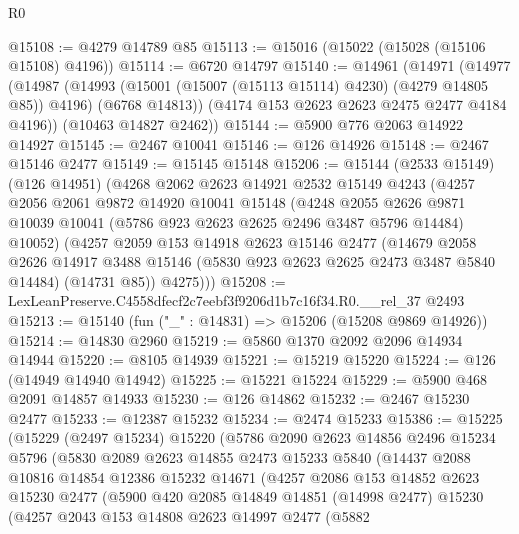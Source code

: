 \begin{lexlean}{R0}
\begin{coremodule}
@15108 := @4279 @14789 @85
@15113 := @15016 (@15022 (@15028 (@15106 @15108) @4196))
@15114 := @6720 @14797
@15140 := @14961
    (@14971
      (@14977
        (@14987
          (@14993 (@15001 (@15007 (@15113 @15114) @4230) (@4279 @14805 @85)) @4196)
          (@6768 @14813))
        (@4174 @153 @2623 @2623 @2475 @2477 @4184 @4196))
      (@10463 @14827 @2462))
@15144 := @5900 @776 @2063 @14922 @14927
@15145 := @2467 @10041
@15146 := @126 @14926
@15148 := @2467 @15146 @2477
@15149 := @15145 @15148
@15206 := @15144
    (@2533 @15149)
    (@126 @14951)
    (@4268
      @2062
      @2623
      @14921
      @2532
      @15149
      @4243
      (@4257
        @2056
        @2061
        @9872
        @14920
        @10041
        @15148
        (@4248
          @2055
          @2626
          @9871
          @10039
          @10041
          (@5786 @923 @2623 @2625 @2496 @3487 @5796 @14484)
          @10052)
        (@4257
          @2059
          @153
          @14918
          @2623
          @15146
          @2477
          (@14679
            @2058
            @2626
            @14917
            @3488
            @15146
            (@5830 @923 @2623 @2625 @2473 @3487 @5840 @14484)
            (@14731 @85))
          @4275)))
@15208 := LexLeanPreserve.C4558dfecf2c7eebf3f9206d1b7c16f34.R0.__rel_37 @2493
@15213 := @15140 (fun ("_" : @14831) => @15206 (@15208 @9869 @14926))
@15214 := @14830 @2960
@15219 := @5860 @1370 @2092 @2096 @14934 @14944
@15220 := @8105 @14939
@15221 := @15219 @15220
@15224 := @126 (@14949 @14940 @14942)
@15225 := @15221 @15224
@15229 := @5900 @468 @2091 @14857 @14933
@15230 := @126 @14862
@15232 := @2467 @15230 @2477
@15233 := @12387 @15232
@15234 := @2474 @15233
@15386 := @15225
    (@15229
      (@2497 @15234)
      @15220
      (@5786
        @2090
        @2623
        @14856
        @2496
        @15234
        @5796
        (@5830
          @2089
          @2623
          @14855
          @2473
          @15233
          @5840
          (@14437
            @2088
            @10816
            @14854
            @12386
            @15232
            @14671
            (@4257
              @2086
              @153
              @14852
              @2623
              @15230
              @2477
              (@5900
                @420
                @2085
                @14849
                @14851
                (@14998 @2477)
                @15230
                (@4257
                  @2043
                  @153
                  @14808
                  @2623
                  @14997
                  @2477
                  (@5882

\end{coremodule}
\end{lexlean}
